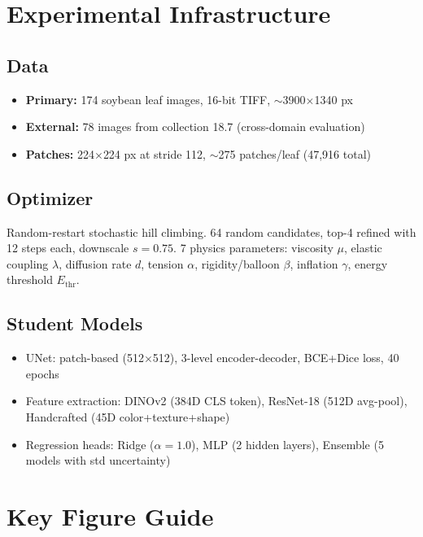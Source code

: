\documentclass[11pt,a4paper]{article}
\begin{document}
\section{Experimental Infrastructure}

\subsection{Data}
\begin{itemize}
\item \textbf{Primary:} 174 soybean leaf images, 16-bit TIFF, $\sim$3900$\times$1340 px
\item \textbf{External:} 78 images from collection 18.7 (cross-domain evaluation)
\item \textbf{Patches:} 224$\times$224 px at stride 112, $\sim$275 patches/leaf (47,916 total)
\end{itemize}

\subsection{Optimizer}
Random-restart stochastic hill climbing. 64 random candidates, top-4 refined with 12 steps each, downscale $s=0.75$. 7 physics parameters: viscosity $\mu$, elastic coupling $\lambda$, diffusion rate $d$, tension $\alpha$, rigidity/balloon $\beta$, inflation $\gamma$, energy threshold $E_{\mathrm{thr}}$.

\subsection{Student Models}
\begin{itemize}
\item UNet: patch-based (512$\times$512), 3-level encoder-decoder, BCE+Dice loss, 40 epochs
\item Feature extraction: DINOv2 (384D CLS token), ResNet-18 (512D avg-pool), Handcrafted (45D color+texture+shape)
\item Regression heads: Ridge ($\alpha=1.0$), MLP (2 hidden layers), Ensemble (5 models with std uncertainty)
\end{itemize}

\section{Key Figure Guide}
\end{document}
